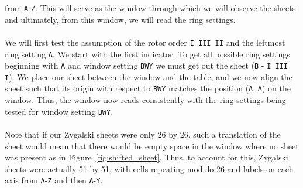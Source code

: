 from \texttt{A}-\texttt{Z}. This will serve as the window through
which we will observe the sheets and ultimately, from this window,
we will read the ring settings.
\\\\We will first test the assumption of
the rotor order \texttt{I III II} and the leftmost ring setting \texttt{A}.
We start with the first indicator. To get all possible ring
settings beginning with \texttt{A} and window setting \texttt{BWY} we
must get out the sheet (\texttt{B} - \texttt{I III I}). We place our
sheet between the window and the table, and we now align the sheet
such that its origin with respect to \texttt{BWY} matches the
position (\texttt{A}, \texttt{A}) on the window. Thus, the window now
reads consistently with the ring settings being tested for window
setting \texttt{BWY}.
\\\\Note that if our Zygalski sheets were only 26 by 26, such a
translation of the sheet would mean that there would be empty space
in the window where no sheet was present as in
Figure~\ref{fig:shifted_sheet}. Thus, to account for this, Zygalski
sheets were actually 51 by 51, with cells repeating modulo 26 and
labels on each axis from \texttt{A}-\texttt{Z} and then \texttt{A}-\texttt{Y}.
